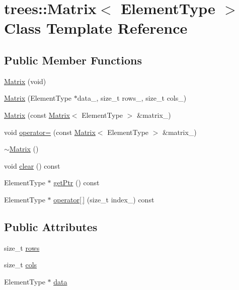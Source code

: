 \hypertarget{classtrees_1_1_matrix}{}\section{trees\+:\+:Matrix$<$ Element\+Type $>$ Class Template Reference}
\label{classtrees_1_1_matrix}
\subsection*{Public Member Functions}
\begin{DoxyCompactItemize}
\item 
\hyperlink{classtrees_1_1_matrix_a363bff5b1ded7ead42eeb72cfee359f3}{Matrix} (void)
\item 
\hyperlink{classtrees_1_1_matrix_a476f805286aeea991d815402c2ff703a}{Matrix} (Element\+Type $\ast$data\+\_\+, size\+\_\+t rows\+\_\+, size\+\_\+t cols\+\_\+)
\item 
\hyperlink{classtrees_1_1_matrix_aaa1772283d722e34a9a914f1d493a754}{Matrix} (const \hyperlink{classtrees_1_1_matrix}{Matrix}$<$ Element\+Type $>$ \&matrix\+\_\+)
\item 
void \hyperlink{classtrees_1_1_matrix_a1467c63bceec8a38771c845fad759784}{operator=} (const \hyperlink{classtrees_1_1_matrix}{Matrix}$<$ Element\+Type $>$ \&matrix\+\_\+)
\item 
\hyperlink{classtrees_1_1_matrix_a4eac26e6570ad219af70aa36eeadc2f7}{$\sim$\+Matrix} ()
\item 
void \hyperlink{classtrees_1_1_matrix_a2ed5574e99debc9db90ccc50afe6aa7a}{clear} () const
\item 
Element\+Type $\ast$ \hyperlink{classtrees_1_1_matrix_ae4c759a614daf9f1f019566eca92edab}{get\+Ptr} () const
\item 
Element\+Type $\ast$ \hyperlink{classtrees_1_1_matrix_a8ef252012ddf2ca4ebfd096ff0a1122b}{operator\mbox{[}$\,$\mbox{]}} (size\+\_\+t index\+\_\+) const
\end{DoxyCompactItemize}
\subsection*{Public Attributes}
\begin{DoxyCompactItemize}
\item 
size\+\_\+t \hyperlink{classtrees_1_1_matrix_a88dfff3f217f59caec11e519b23153f6}{rows}
\item 
size\+\_\+t \hyperlink{classtrees_1_1_matrix_a612011a0ae81b3e9d0a7e44a7e827f5c}{cols}
\item 
Element\+Type $\ast$ \hyperlink{classtrees_1_1_matrix_ac7cf0dc5123d2df5cfbac43c5b3c3ee6}{data}
\end{DoxyCompactItemize}


